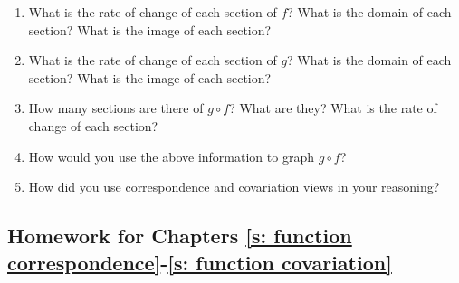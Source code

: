 \documentclass[11pt]{article}
\theoremstyle{definition}
\begin{document}
\begin{enumerate}
\item What is the rate of change of each section of $f$? What is the domain of each section?
 What is the image of each section?

\item What is the rate of change of each section of $g$? What is the domain of each section?  What is the image of each section?

\item How many sections are there of $g\circ f$? What are they? What is the rate of change of each section?

\item How would you use the above information to graph $g\circ f$?

\item How did you use correspondence and covariation views in your reasoning?
\end{enumerate}

\newpage \subsection{Homework for Chapters \ref{s: function correspondence}-\ref{s: function covariation}}
\end{document}
